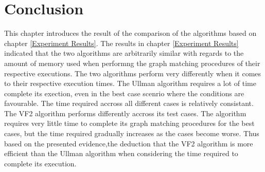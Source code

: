 \section{Conclusion}
\label{Conclusion}
This chapter introduces the result of the comparison of the algorithms based on chapter \ref{Experiment Results}. The results in chapter \ref{Experiment Results} 
indicated that the two algorithms are arbitrarily similar with regards to the amount of memory used when performng the graph matching procedures of their
respective executions.\newline\newline
The two algorithms perform very differently when it comes to their respective execution times. The Ullman algorithm requires a lot of time complete its 
exection, even in the best case scenrio where the conditions are favourable. The time required accross all different cases is relatively consistant.\newline
The VF2 algorithm performs differently accross its test cases. The algorithm requires very little time to complete its graph matching procedures for the 
best cases, but the time required gradually increases as the cases become worse. Thus based on the presented evidence,the deduction that the VF2 algorithm 
is more efficient than the Ullman algorithm when considering the time required to complete its execution.
\newpage